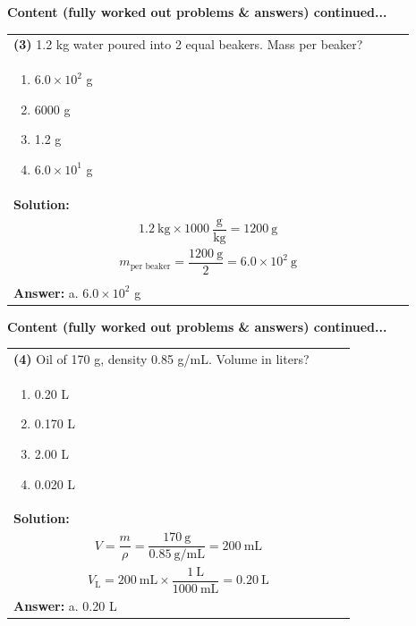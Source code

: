 \documentclass{article}
\begin{document}
{\newpage
\noindent
{\large\textbf{Content (fully worked out problems \& answers) continued...}}\\[0.2em]
\vspace{0.2cm}
\begin{tabular}{|p{0.9\linewidth}|}
\hline
\vspace{0.2cm}
\textbf{(3)} 1.2 kg water poured into 2 equal beakers. Mass per beaker? \\
\begin{minipage}[t]{0.85\linewidth}
\begin{enumerate}[label=\alph*.]
   \item $6.0\times10^2$ g
   \item 6000 g
   \item 1.2 g
   \item $6.0\times10^1$ g
\end{enumerate}
\end{minipage}\\
\hline
\vspace{0.2cm}
\textbf{Solution:} \\
\[
1.2~\text{kg} \times 1000~\frac{\text{g}}{\text{kg}} = 1200~\text{g}
\] \\
\[
m_\text{per beaker} = \frac{1200~\text{g}}{2} = 6.0 \times 10^2~\text{g}
\] \\
\\
\hline
\vspace{0.2cm}
\textbf{Answer:} a. $6.0\times10^2$ g \\
\hline
\end{tabular}

\newpage
\noindent
{\large\textbf{Content (fully worked out problems \& answers) continued...}}\\[0.2em]
\vspace{0.2cm}
\begin{tabular}{|p{0.9\linewidth}|}
\hline
\vspace{0.2cm}
\textbf{(4)} Oil of 170 g, density 0.85 g/mL. Volume in liters? \\
\begin{minipage}[t]{0.85\linewidth}
\begin{enumerate}[label=\alph*.]
   \item 0.20 L
   \item 0.170 L
   \item 2.00 L
   \item 0.020 L
\end{enumerate}
\end{minipage}\\
\hline
\vspace{0.2cm}
\textbf{Solution:} \\
\[
V = \frac{m}{\rho} = \frac{170~\text{g}}{0.85~\text{g/mL}} = 200~\text{mL}
\] \\
\[
V_\text{L} = 200~\text{mL} \times \frac{1~\text{L}}{1000~\text{mL}} = 0.20~\text{L}
\] \\ 
\hline
\vspace{0.2cm}
\textbf{Answer:} a. 0.20 L \\
\hline
\end{tabular}

}
\end{document}
